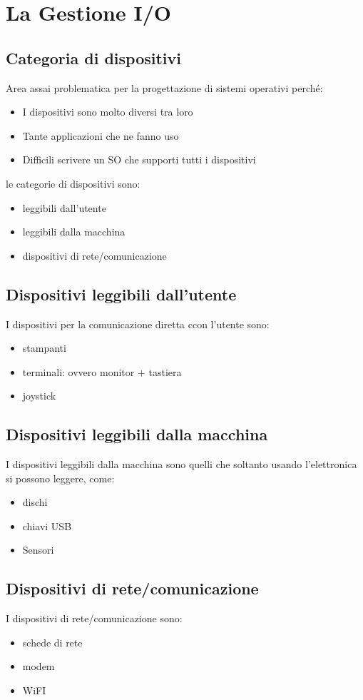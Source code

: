 \section{La Gestione I/O}
\subsection{Categoria di dispositivi}
Area assai problematica per la progettazione di sistemi operativi perché:
\begin{itemize}
    \item I dispositivi sono molto diversi tra loro
    \item Tante applicazioni che ne fanno uso
    \item Difficili scrivere un SO che supporti tutti i dispositivi
\end{itemize}
le categorie di dispositivi sono:
\begin{itemize}
    \item leggibili dall'utente
    \item leggibili dalla macchina
    \item dispositivi di rete/comunicazione
\end{itemize}
\subsection{Dispositivi leggibili dall'utente}
I dispositivi per la comunicazione diretta ccon l'utente sono:
\begin{itemize}
    \item stampanti
    \item terminali: ovvero monitor + tastiera
    \item joystick
\end{itemize}
\subsection{Dispositivi leggibili dalla macchina}
I dispositivi leggibili dalla macchina sono quelli che soltanto usando l'elettronica si possono leggere, come:
\begin{itemize}
    \item dischi
    \item chiavi USB
    \item Sensori
\end{itemize}
\subsection{Dispositivi di rete/comunicazione}
I dispositivi di rete/comunicazione sono:
\begin{itemize}
    \item schede di rete
    \item modem
    \item WiFI
\end{itemize}

